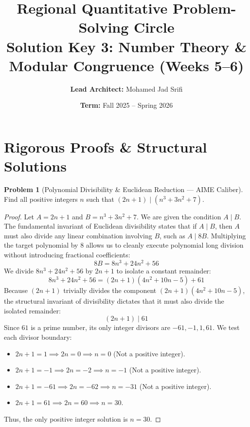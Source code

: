 \documentclass[11pt, a4paper]{article}
\theoremstyle{definition}
\newtheorem{problem}{Problem}
\theoremstyle{plain}
\begin{document}
\title{\vspace{-1.5cm}\textbf{Regional Quantitative Problem-Solving Circle} \\ \Large Solution Key 3: Number Theory \& Modular Congruence (Weeks 5--6)}
\author{\textbf{Lead Architect:} Mohamed Jad Srifi}
\date{\textbf{Term:} Fall 2025 -- Spring 2026}
\maketitle

\section*{Rigorous Proofs \& Structural Solutions}

\begin{problem}[Polynomial Divisibility \& Euclidean Reduction --- AIME Caliber]
Find all positive integers $n$ such that $(2n + 1) \mid (n^3 + 3n^2 + 7)$.
\end{problem}

\begin{proof}
Let $A = 2n + 1$ and $B = n^3 + 3n^2 + 7$. We are given the condition $A \mid B$.
The fundamental invariant of Euclidean divisibility states that if $A \mid B$, then $A$ must also divide any linear combination involving $B$, such as $A \mid 8B$. 
Multiplying the target polynomial by $8$ allows us to cleanly execute polynomial long division without introducing fractional coefficients:
\[
8B = 8n^3 + 24n^2 + 56
\]
We divide $8n^3 + 24n^2 + 56$ by $2n + 1$ to isolate a constant remainder:
\[
8n^3 + 24n^2 + 56 = (2n + 1)(4n^2 + 10n - 5) + 61
\]
Because $(2n + 1)$ trivially divides the component $(2n + 1)(4n^2 + 10n - 5)$, the structural invariant of divisibility dictates that it must also divide the isolated remainder:
\[
(2n + 1) \mid 61
\]
Since $61$ is a prime number, its only integer divisors are $-61, -1, 1, 61$. We test each divisor boundary:
\begin{itemize}
    \item $2n + 1 = 1 \implies 2n = 0 \implies n = 0$ (Not a positive integer).
    \item $2n + 1 = -1 \implies 2n = -2 \implies n = -1$ (Not a positive integer).
    \item $2n + 1 = -61 \implies 2n = -62 \implies n = -31$ (Not a positive integer).
    \item $2n + 1 = 61 \implies 2n = 60 \implies n = 30$.
\end{itemize}
Thus, the only positive integer solution is $n = 30$. 
\end{proof}
\end{document}
